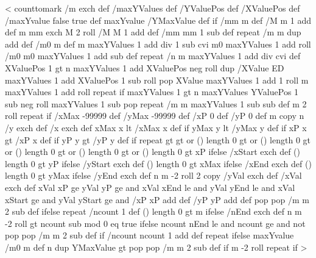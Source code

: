 <{%
  counttomark /m exch def
  /maxYValues \psk@plotNoMax\space def
  /YValuePos \psk@plotNo\space def
  /XValuePos \psk@plotNoX\space def
  /maxYvalue \ifx\empty\psk@plotYMax false \else true \fi def
  maxYvalue { /YMaxValue \psk@plotYMax\space def } if
  \ifPsk@xyValues\else %
    /mm m def
    /M m 1 add def
    m { mm exch M 2 roll /M M 1 add def /mm mm 1 sub def } repeat
    /m m dup add def
  \fi
  \ifPst@ChangeOrder
    /m0 m def
    m maxYValues 1 add div 1 sub cvi {
      m0 maxYValues 1 add roll /m0 m0 maxYValues 1 add sub def
    } repeat
  \fi
  /n m maxYValues 1 add div cvi def
%
%
  XValuePos 1 gt {%
    n {
      maxYValues 1 add XValuePos neg roll    %
      dup /XValue ED
      maxYValues 1 add XValuePos 1 sub  roll %
      pop XValue                             %
      maxYValues 1 add 1 roll                %
      m maxYValues 1 add  roll               %
    } repeat
  } if %
  maxYValues 1 gt {%
    n {
      maxYValues YValuePos 1 sub neg roll %
      maxYValues 1 sub { pop } repeat     %
      /m m maxYValues 1 sub sub def
      m 2 roll
    } repeat
  } if %
  /xMax -99999 def /yMax -99999 def
  /xP 0 def /yP 0 def
  m copy
  n {
    /y exch def /x exch def
    xMax x lt { /xMax x def } if
    yMax y lt {/yMax y def } if
    xP x gt { /xP x def } if
    yP y gt { /yP y def } if
  } repeat
  \psk@xStep{} gt \psk@yStep{} gt or (\psk@xStart) length 0 gt or
  (\psk@yStart) length 0 gt or (\psk@xEnd) length 0 gt or (\psk@yEnd) length 0 gt or {
%
    (\psk@xStart) length 0 gt {\psk@xStart\space }{ xP } ifelse /xStart exch def
    (\psk@yStart) length 0 gt {\psk@yStart\space }{ yP } ifelse /yStart exch def
    (\psk@xEnd) length 0 gt { \psk@xEnd\space }{ xMax } ifelse /xEnd exch def
    (\psk@yEnd) length 0 gt { \psk@yEnd\space }{ yMax } ifelse /yEnd exch def
    n {
      m -2 roll
      2 copy /yVal exch def /xVal exch def
      xVal xP ge
      yVal yP ge and
      xVal xEnd le and
      yVal yEnd le and
      xVal xStart ge and
      yVal yStart ge and {
        /xP xP \psk@xStep\space add def
        /yP yP \psk@yStep\space add def
      }{%
        pop pop
        /m m 2 sub def
      } ifelse
    } repeat
  }{%
    /ncount 1 def
    (\psk@nEnd) length 0 gt { \psk@nEnd\space }{ m } ifelse 
    /nEnd exch def
    n {
      m -2 roll
      \psk@nStep{} gt { ncount \psk@nStart\space sub \psk@nStep\space mod 0 eq }{ true } ifelse
        ncount nEnd le and
        ncount \psk@nStart\space ge and not {
          pop pop
          /m m 2 sub def
        } if
        /ncount ncount 1 add def
      } repeat
  } ifelse
  maxYvalue { %
    /m0 m def
    n {
      dup YMaxValue gt { pop pop /m m 2 sub def } if
      m -2 roll 
    } repeat
  } if
}>
